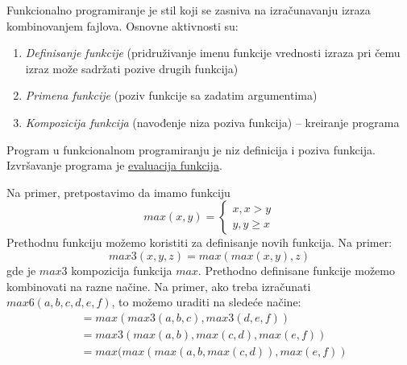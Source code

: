 \documentclass[../main.tex]{subfiles}
\begin{document}
Funkcionalno programiranje je stil koji se zasniva na izračunavanju izraza kombinovanjem fajlova. Osnovne aktivnosti su:
\begin{enumerate}
\item {\it Definisanje funkcije} (pridruživanje imenu funkcije vrednosti izraza pri čemu izraz može sadržati pozive drugih funkcija)
\item {\it Primena funkcije} (poziv funkcije sa zadatim argumentima)
\item {\it Kompozicija funkcija} (navođenje niza poziva funkcija) -- kreiranje programa
\end{enumerate}
Program u funkcionalnom programiranju je niz definicija i poziva funkcija. Izvršavanje programa je \underline{evaluacija funkcija}.

\begin{boxprimer}	
Na primer, pretpostavimo da imamo funkciju $$ max(x,y) = \left\{\begin{array}{c} x , x>y \\ y , y\ge x \end{array} \right.$$
Prethodnu funkciju možemo koristiti za definisanje novih funkcija. Na primer: $$ max3(x,y,z)=max(max(x,y),z)$$ gde je $max3$ kompozicija funkcija $max$. Prethodno definisane funkcije možemo kombinovati na razne načine. Na primer, ako treba izračunati $max6(a,b,c,d,e,f)$, to možemo uraditi na sledeće načine:
\begin{align*}
&= max(max3(a,b,c), max3(d,e,f))\\
&= max3(max(a,b), max(c,d), max(e,f))\\
&= max(max(max(a,b, max(c,d)), max(e,f))
\end{align*}

\end{boxprimer}
\end{document}
